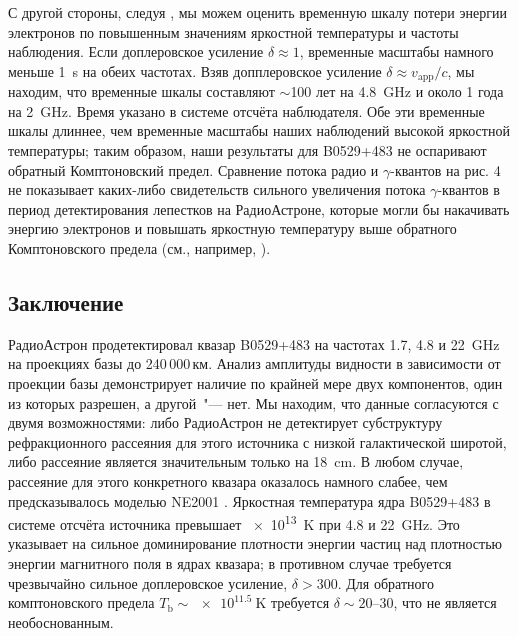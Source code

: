 С другой стороны, следуя \cite{Readhead_1994}, мы можем оценить временную шкалу потери энергии
электронов по повышенным значениям яркостной температуры и частоты наблюдения. Если доплеровское
усиление $\delta \approx 1$, временные масштабы намного меньше \SI{1}{\second} на обеих частотах.
Взяв допплеровское усиление $\delta\approx v_\text{app}/c$, мы находим, что временные шкалы
составляют $\sim$100 лет на \SI{4.8}{\GHz} и около 1 года на \SI{2}{\GHz}. Время указано в системе
отсчёта наблюдателя. Обе эти временные шкалы длиннее, чем временные масштабы наших наблюдений
высокой яркостной температуры; таким образом, наши результаты для B0529+483 не оспаривают обратный
Комптоновский предел. Сравнение потока радио и $\gamma$-квантов на рис. 4 не показывает каких-либо
свидетельств сильного увеличения потока $\gamma$-квантов в период детектирования лепестков на
РадиоАстроне, которые могли бы накачивать энергию электронов и повышать яркостную температуру выше
обратного Комптоновского предела (см., например, \cite{Readhead_1994,Kovalev_2016}).

\subsection{Заключение}

РадиоАстрон продетектировал квазар B0529+483 на частотах 1.7, 4.8 и \SI{22}{\GHz} на проекциях базы
до 240\,000\,км. Анализ амплитуды видности в зависимости от проекции базы
демонстрирует наличие по крайней мере двух компонентов, один из которых разрешен, а другой~"---
нет. Мы находим, что данные согласуются с двумя возможностями: либо РадиоАстрон не детектирует
субструктуру рефракционного рассеяния для этого источника с низкой галактической широтой, либо
рассеяние является значительным только на \SI{18}{\cm}. В любом случае, рассеяние для этого
конкретного квазара оказалось намного слабее, чем предсказывалось моделью NE2001
\cite{Cordes_2002}. Яркостная температура ядра B0529+483 в системе отсчёта источника превышает
\SI{e13}{\kelvin} при 4.8 и \SI{22}{\GHz}. Это указывает на сильное доминирование плотности энергии
частиц над плотностью энергии магнитного поля в ядрах квазара; в противном случае требуется
чрезвычайно сильное доплеровское усиление, $\delta > 300$. Для обратного комптоновского предела
$T_\text{b} \sim \SI{e11.5}{\kelvin}$ требуется $\delta \sim \text{20--30}$, что не является
необоснованным.
